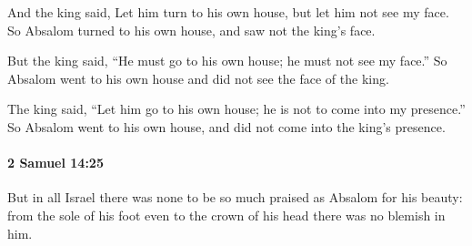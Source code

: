 			\begin{versebox}
					\item[BHS] 
					\item[ASV] And the king said, Let him turn to his own house, but let him not see my face. So Absalom turned to his own house, and saw not the king's face.
					\item[NIV] But the king said, “He must go to his own house; he must not see my face.” So Absalom went to his own house and did not see the face of the king.
					\item[NRSV] The king said, “Let him go to his own house; he is not to come into my presence.” So Absalom went to his own house, and did not come into the king’s presence.
			\end{versebox}

		\paragraph{2 Samuel 14:25} %
			\label{2SAMUEL-14-25}

			But in all Israel there was none to be so much praised as Absalom for his beauty: from the sole of his foot even to the crown of his head there was no blemish in him.

